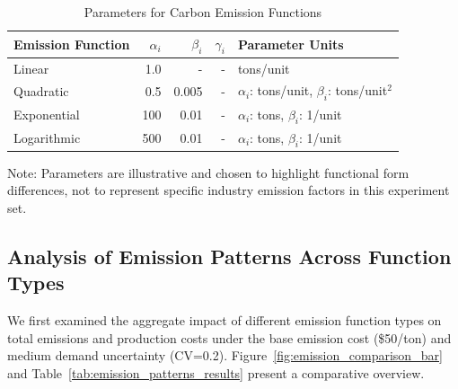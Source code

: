 \begin{table}[htbp]
    \centering
    \caption{Parameters for Carbon Emission Functions}
    \label{tab:emission_parameters}
    \begin{tabular}{lrrrl}
        \toprule
        Emission Function & $\alpha_i$ & $\beta_i$ & $\gamma_i$ & Parameter Units \\
        \midrule
        Linear & 1.0 & - & - & tons/unit \\
        Quadratic & 0.5 & 0.005 & - & $\alpha_i$: tons/unit, $\beta_i$: tons/unit$^2$ \\
        Exponential & 100 & 0.01 & - & $\alpha_i$: tons, $\beta_i$: 1/unit \\
        Logarithmic & 500 & 0.01 & - & $\alpha_i$: tons, $\beta_i$: 1/unit \\
        \bottomrule
    \end{tabular}

    \footnotesize{Note: Parameters are illustrative and chosen to highlight functional form differences, not to represent specific industry emission factors in this experiment set.}
\end{table}


\subsection{Analysis of Emission Patterns Across Function Types}
\label{subsec:emission_patterns}
We first examined the aggregate impact of different emission function types on total emissions and production costs under the base emission cost (\$50/ton) and medium demand uncertainty (CV=0.2). Figure~\ref{fig:emission_comparison_bar} and Table~\ref{tab:emission_patterns_results} present a comparative overview.

